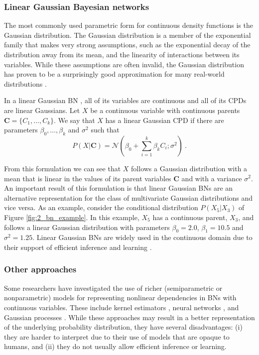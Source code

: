 \subsubsection*{Linear Gaussian Bayesian networks}
The most commonly used parametric form for continuous density functions is the Gaussian distribution. The Gaussian distribution is a member of the exponential family \citep{wainwright2008} that makes very strong assumptions, such as the exponential decay of the distribution away from its mean, and the linearity of interactions between its variables. While these assumptions are often invalid, the Gaussian distribution has proven to be a surprisingly good approximation for many real-world distributions \citep{kotz2004}.

In a linear Gaussian BN \citep{shachter1989_gauss}, all of its variables are continuous and all of its CPDs are linear Gaussians. Let $X$ be a continuous variable with continuous parents $\mathbf{C} = \{C_{1},\dots, C_{k}\}$. We say that $X$ has a linear Gaussian CPD if there are parameters $\beta_{0},\dots,\beta_{k}$ and $\sigma^{2}$ such that
\begin{equation*}
P(X|\mathbf{C}) = \mathcal{N}(\beta_{0} + \sum_{i=1}^{k}\beta_{k}C_{i}; \sigma^{2}) \ .
\end{equation*}

From this formulation we can see that $X$ follows a Gaussian distribution with a mean that is linear in the values of its parent variables $\mathbf{C}$ and with a variance $\sigma^{2}$. An important result of this formulation is that linear Gaussian BNs are an alternative representation for the class of multivariate Gaussian distributions and vice versa. As an example, consider the conditional distribution $P(X_{5}|X_{3})$ of Figure \ref{fig:2_bn_example}. In this example, $X_{5}$ has a  continuous parent, $X_{3}$, and follows a linear Gaussian distribution with parameters $\beta_{0} = 2.0$, $\beta_{1} = 10.5$ and $\sigma^{2} = 1.25$. Linear Gaussian BNs are widely used in the continuous domain due to their support of efficient inference \citep{koller2009} and learning \citep{geiger1994_bge}.
\subsubsection*{Other approaches}
Some researchers have investigated the use of richer (semiparametric or nonparametric) models for representing nonlinear dependencies in BNs with continuous variables. These include kernel estimators \citep{hofmann1995}, neural networks \citep{monti1997,choi2018}, and Gaussian processes \citep{friedman2000_gp}. While these approaches may result in a better representation of the underlying probability distribution, they have several disadvantages: (i) they are harder to interpret due to their use of models that are opaque to humans, and (ii) they do not usually allow efficient inference or learning.
